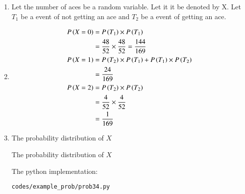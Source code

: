 \renewcommand{\theequation}{\theenumi}
\begin{enumerate}

\item Let the number of aces  be a random variable. Let it it be denoted by X. Let $T_{1}$ be a event of not getting an ace and $T_{2}$ be a event of getting an ace. 

\item 
\begin{align*}
P\left(X=0\right) &= P\left(T_{1}\right) \times P\left(T_{1}\right) \\
&= \frac{48}{52} \times \frac{48}{52} = \frac{144}{169} \\ 
P\left(X=1\right) &=  P\left(T_{2}\right) \times  P\left(T_{1}\right) + P\left(T_{1}\right) \times P\left(T_{2}\right) \\
&= \frac{24}{169} \\
P\left(X=2\right) &= P\left(T_{2}\right) \times P\left(T_{2}\right) \\
&= \frac{4}{52} \times \frac{4}{52}\\
&= \frac{1}{169}\\
\end{align*}

\item The probability distribution of $X$ \\
\begin{table}[ht!]
\centering

\caption{The probability distribution of $X$}
\end{table} 
 

The python implementation:
\begin{lstlisting}
codes/example_prob/prob34.py
\end{lstlisting}

\end{enumerate}